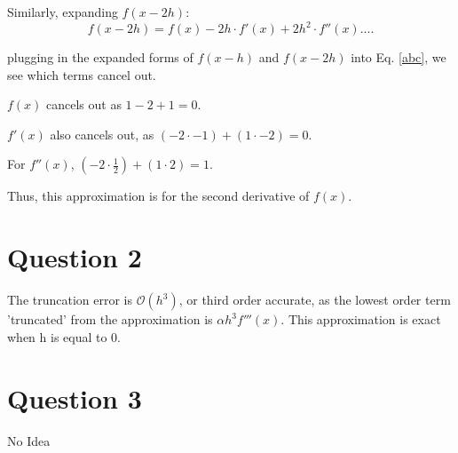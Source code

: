 \documentclass{article}
\begin{document}
Similarly, expanding $f(x-2h)$:
\begin{equation}
    \label{fx_2h}
    f(x-2h) = f(x) -2h\cdot f'(x) + 2h^2\cdot f''(x) ....
\end{equation}

plugging in the expanded forms of $f(x-h)$ and $f(x-2h)$ into Eq. \ref{abc}, we see which terms cancel out. 

$f(x)$ cancels out as $1-2+1 = 0$.

$f'(x)$ also cancels out, as $(-2 \cdot -1) + (1 \cdot-2) = 0$.

For $f''(x)$, $(-2 \cdot \frac{1}{2}) + (1 \cdot 2) = 1$.

Thus, this approximation is for the second derivative of $f(x)$.

\section{Question 2}
The truncation error is $\mathcal{O}(h^3)$, or third order accurate, as the lowest order term 'truncated' from the approximation is $\alpha h^3f'''(x)$. This approximation is exact when h is equal to 0.

\section{Question 3}
No Idea
\end{document}
